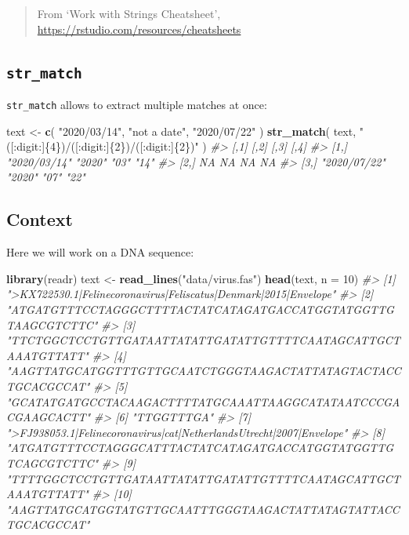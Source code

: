 \documentclass[]{book}
\newenvironment{Shaded}{}{}
\newcommand{\CommentTok}[1]{\textcolor[rgb]{0.38,0.63,0.69}{\textit{#1}}}
\newcommand{\DataTypeTok}[1]{\textcolor[rgb]{0.56,0.13,0.00}{#1}}
\newcommand{\DecValTok}[1]{\textcolor[rgb]{0.25,0.63,0.44}{#1}}
\newcommand{\KeywordTok}[1]{\textcolor[rgb]{0.00,0.44,0.13}{\textbf{#1}}}
\newcommand{\NormalTok}[1]{#1}
\newcommand{\StringTok}[1]{\textcolor[rgb]{0.25,0.44,0.63}{#1}}
\begin{document}
\begin{quote}
From `Work with Strings Cheatsheet', \url{https://rstudio.com/resources/cheatsheets}
\end{quote}

\hypertarget{str_match}{%
\subsection{\texorpdfstring{\texttt{str\_match}}{str\_match}}\label{str_match}}

\texttt{str\_match} allows to extract multiple matches at once:

\begin{Shaded}
\begin{Highlighting}[]
\NormalTok{text <-}\StringTok{ }\KeywordTok{c}\NormalTok{(}
  \StringTok{"2020/03/14"}\NormalTok{,}
  \StringTok{"not a date"}\NormalTok{,}
  \StringTok{"2020/07/22"}
\NormalTok{)}
\KeywordTok{str_match}\NormalTok{(}
\NormalTok{  text, }\StringTok{"([:digit:]\{4\})/([:digit:]\{2\})/([:digit:]\{2\})"}
\NormalTok{)}
\CommentTok{#>      [,1]         [,2]   [,3] [,4]}
\CommentTok{#> [1,] "2020/03/14" "2020" "03" "14"}
\CommentTok{#> [2,] NA           NA     NA   NA  }
\CommentTok{#> [3,] "2020/07/22" "2020" "07" "22"}
\end{Highlighting}
\end{Shaded}

\hypertarget{context}{%
\subsection{Context}\label{context}}

Here we will work on a DNA sequence:

\begin{Shaded}
\begin{Highlighting}[]
\KeywordTok{library}\NormalTok{(readr)}
\NormalTok{text <-}\StringTok{ }\KeywordTok{read_lines}\NormalTok{(}\StringTok{"data/virus.fas"}\NormalTok{)}
\KeywordTok{head}\NormalTok{(text, }\DataTypeTok{n =} \DecValTok{10}\NormalTok{)}
\CommentTok{#>  [1] ">KX722530.1|Felinecoronavirus|Feliscatus|Denmark|2015|Envelope"    }
\CommentTok{#>  [2] "ATGATGTTTCCTAGGGCTTTTACTATCATAGATGACCATGGTATGGTTGTAAGCGTCTTC"      }
\CommentTok{#>  [3] "TTCTGGCTCCTGTTGATAATTATATTGATATTGTTTTCAATAGCATTGCTAAATGTTATT"      }
\CommentTok{#>  [4] "AAGTTATGCATGGTTTGTTGCAATCTGGGTAAGACTATTATAGTACTACCTGCACGCCAT"      }
\CommentTok{#>  [5] "GCATATGATGCCTACAAGACTTTTATGCAAATTAAGGCATATAATCCCGACGAAGCACTT"      }
\CommentTok{#>  [6] "TTGGTTTGA"                                                         }
\CommentTok{#>  [7] ">FJ938053.1|Felinecoronavirus|cat|NetherlandsUtrecht|2007|Envelope"}
\CommentTok{#>  [8] "ATGATGTTTCCTAGGGCATTTACTATCATAGATGACCATGGTATGGTTGTCAGCGTCTTC"      }
\CommentTok{#>  [9] "TTTTGGCTCCTGTTGATAATTATATTGATATTGTTTTCAATAGCATTGCTAAATGTTATT"      }
\CommentTok{#> [10] "AAGTTATGCATGGTATGTTGCAATTTGGGTAAGACTATTATAGTATTACCTGCACGCCAT"}
\end{Highlighting}
\end{Shaded}
\end{document}
